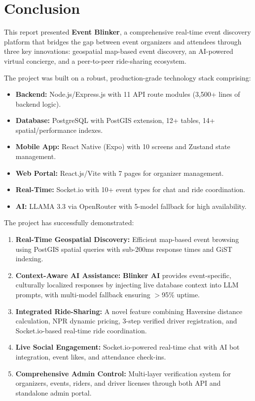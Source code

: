 \chapter{Conclusion}

This report presented \textbf{Event Blinker}, a comprehensive real-time event discovery platform that bridges the gap between event organizers and attendees through three key innovations: geospatial map-based event discovery, an AI-powered virtual concierge, and a peer-to-peer ride-sharing ecosystem.

The project was built on a robust, production-grade technology stack comprising:
\begin{itemize}[noitemsep]
    \item \textbf{Backend:} Node.js/Express.js with 11 API route modules (3,500+ lines of backend logic).
    \item \textbf{Database:} PostgreSQL with PostGIS extension, 12+ tables, 14+ spatial/performance indexes.
    \item \textbf{Mobile App:} React Native (Expo) with 10 screens and Zustand state management.
    \item \textbf{Web Portal:} React.js/Vite with 7 pages for organizer management.
    \item \textbf{Real-Time:} Socket.io with 10+ event types for chat and ride coordination.
    \item \textbf{AI:} LLAMA 3.3 via OpenRouter with 5-model fallback for high availability.
\end{itemize}

\noindent The project has successfully demonstrated:
\begin{enumerate}
    \item \textbf{Real-Time Geospatial Discovery:} Efficient map-based event browsing using PostGIS spatial queries with sub-200ms response times and GiST indexing.
    \item \textbf{Context-Aware AI Assistance:} \textbf{Blinker AI} provides event-specific, culturally localized responses by injecting live database context into LLM prompts, with multi-model fallback ensuring $>$95\% uptime.
    \item \textbf{Integrated Ride-Sharing:} A novel feature combining Haversine distance calculation, NPR dynamic pricing, 3-step verified driver registration, and Socket.io-based real-time ride coordination.
    \item \textbf{Live Social Engagement:} Socket.io-powered real-time chat with AI bot integration, event likes, and attendance check-ins.
    \item \textbf{Comprehensive Admin Control:} Multi-layer verification system for organizers, events, riders, and driver licenses through both API and standalone admin portal.
\end{enumerate}

